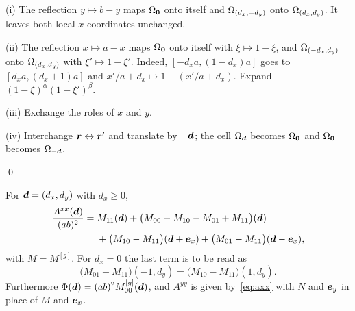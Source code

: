 (i) The reflection $y\mapsto b-y$ maps $\Omega_{\vb*{0}}$ onto itself and $\Omega_{(d_x,-d_y)}$ onto $\Omega_{(d_x,d_y)}$. It leaves
both local $x$-coordinates unchanged.

(ii) The reflection $x\mapsto a-x$ maps $\Omega_{\vb*{0}}$ onto itself with $\xi\mapsto1-\xi$, and $\Omega_{(-d_x,d_y)}$ onto
$\Omega_{(d_x,d_y)}$ with $\xi'\mapsto1-\xi'$. Indeed, $[-d_xa,(1-d_x)a]$ goes to $[d_xa,(d_x+1)a]$ and
$x'/a+d_x\mapsto 1-(x'/a+d_x)$. Expand $(1-\xi)^\alpha(1-\xi')^\beta$.

(iii) Exchange the roles of $x$ and $y$.

(iv) Interchange $\vb*{r}\leftrightarrow\vb*{r}'$ and translate by $-\vb*{d}$; the cell $\Omega_{\vb*{d}}$ becomes $\Omega_{\vb*{0}}$ and
$\Omega_{\vb*{0}}$ becomes $\Omega_{-\vb*{d}}$.

\qed

 For $\vb*{d}=(d_x,d_y)$ with $d_x\ge0$,
\begin{equation}
    \label{eq:axx}
    \begin{split}
    \frac{A^{xx}(\vb*{d})}{(ab)^2} = {}& M_{11}(\vb*{d}) + \bigl(M_{00}-M_{10}-M_{01}+M_{11}\bigr)(\vb*{d})\\
    &+ \bigl(M_{10}-M_{11}\bigr)(\vb*{d}+\vb*{e}_x) + \bigl(M_{01}-M_{11}\bigr)(\vb*{d}-\vb*{e}_x),
    \end{split}
\end{equation}
with $M=M^{[g]}$. For $d_x=0$ the last term is to be read as
\begin{equation}
    \bigl(M_{01}-M_{11}\bigr)(-1,d_y) = \bigl(M_{10}-M_{11}\bigr)(1,d_y).
\end{equation}
Furthermore
$\Phi(\vb*{d})=(ab)^2M^{[g]}_{00}(\vb*{d})$, and $A^{yy}$ is given by~\eqref{eq:axx} with $N$ and $\vb*{e}_y$ in place of $M$ and $\vb*{e}_x$.

